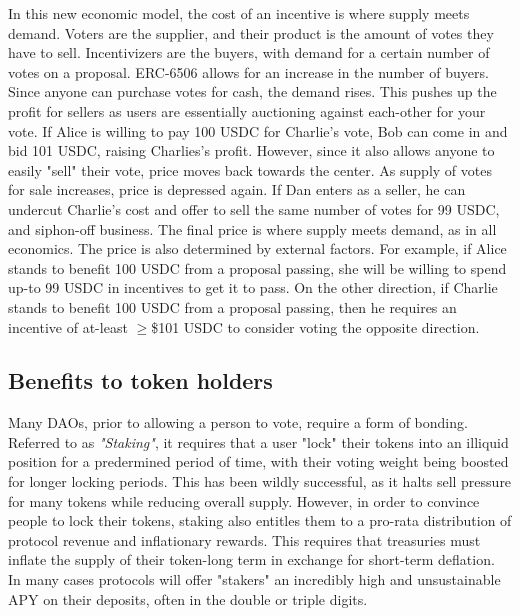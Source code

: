 \documentclass{article}
\begin{document}
In this new economic model, the cost of an incentive is where supply meets demand. Voters are the supplier, and their product is the amount of votes they have to sell. Incentivizers are the buyers, with demand for a certain number of votes on a proposal. ERC-6506 allows for an increase in the number of buyers. Since anyone can purchase votes for cash, the demand rises. This pushes up the profit for sellers as users are essentially auctioning against each-other for your vote. If Alice is willing to pay 100 USDC for Charlie's vote, Bob can come in and bid 101 USDC, raising Charlies's profit. However, since it also allows anyone to easily "sell" their vote, price moves back towards the center. As supply of votes for sale increases, price is depressed again. If Dan enters as a seller, he can undercut Charlie's cost and offer to sell the same number of votes for 99 USDC, and siphon-off business. The final price is where supply meets demand, as in all economics. The price is also determined by external factors. For example, if Alice stands to benefit 100 USDC from a proposal passing, she will be willing to spend up-to 99 USDC in incentives to get it to pass. On the other direction, if Charlie stands to benefit 100 USDC from a proposal passing, then he requires an incentive of at-least $\ge$\$101 USDC to consider voting the opposite direction.

\subsection{Benefits to token holders}

Many DAOs, prior to allowing a person to vote, require a form of bonding. Referred to as \emph{"Staking"}, it requires that a user "lock" their tokens into an illiquid position for a predermined period of time, with their voting weight being boosted for longer locking periods. This has been wildly successful, as it halts sell pressure for many tokens while reducing overall supply. However, in order to convince people to lock their tokens, staking also entitles them to a pro-rata distribution of protocol revenue and inflationary rewards. This requires that treasuries must inflate the supply of their token-long term in exchange for short-term deflation. In many cases protocols will offer "stakers" an incredibly high and unsustainable APY on their deposits, often in the double or triple digits.
\end{document}

